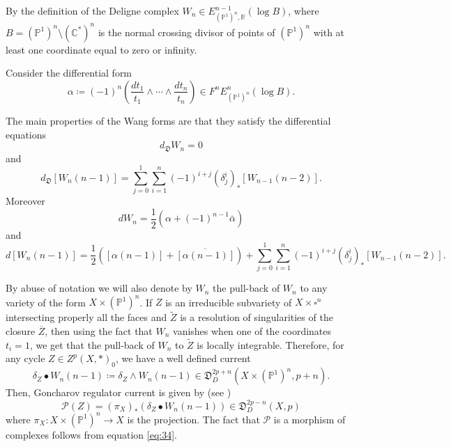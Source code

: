 \documentclass[11pt,a4paper]{amsart}
\newcommand{\C}{\mathds{C}}
\renewcommand{\P}{\mathds{P}}
\newcommand{\R}{\mathds{R}}
\newcommand{\caP}{\mathcal{P}}
\newcommand{\fD}{\mathfrak{D}}
\numberwithin{equation}{section}
\theoremstyle{plain}
\theoremstyle{definition}
\begin{document}
By the definition of the Deligne complex $W_{n}\in
E^{n-1}_{(\P^{1})^{n},\R}(\log B)$, where $B=(\P^{1})^{n}\setminus
(\C^{\ast})^{n}$ is the normal crossing divisor of points of
$(\P^{1})^{n}$ with at least one coordinate equal to zero or infinity.

Consider the differential form
\begin{displaymath} \alpha
\coloneqq(-1)^{n}\left(\frac{dt_{1}}{t_{1}}\wedge\cdots\wedge
\frac{dt_{n}}{t_{n}}\right)\in F^{n}E^{n}_{(\P^1)^{n}}(\log
B).
\end{displaymath}

The main properties of the Wang forms are that they satisfy the
differential equations
\begin{displaymath}
  d_{\fD}W_{n}=0
\end{displaymath}
and
\begin{equation}\label{eq:34}
  d_{\fD}[W_{n}(n-1)] =\sum_{j=0}^{1} \sum_{i=1}^{n}(-1)^{i+j}(\delta _{j}^{i})_{\ast}[W_{n-1}(n-2)]. 
\end{equation}
Moreover
\begin{displaymath}
  dW_n=\frac{1}{2}(\alpha +(-1)^{n-1}\bar \alpha )
\end{displaymath}
and 
\begin{equation}\label{eq:53}
  d[W_{n}(n-1)] =\frac{1}{2}([\alpha(n-1)] +\overline{[ \alpha(n-1)]} )+ \sum_{j=0}^{1} \sum_{i=1}^{n}(-1)^{i+j}(\delta _{j}^{i})_{\ast}[W_{n-1}(n-2)]. 
\end{equation}


 By abuse of notation we will also denote by $W_{n}$ the 
pull-back of $W_{n}$ to any variety of the form $X\times
(\P^{1})^{n}$.
If $Z$ is an irreducible subvariety of $X\times
\square^{n}$ intersecting properly all the faces and $\widetilde Z$
is a resolution of singularities of the closure $\overline Z$, then
using the fact that $W_{n}$ vanishes when one of the coordinates
$t_{i}=1$, we get that the pull-back of $W_{n}$ to $\widetilde Z$ is locally integrable.  
Therefore, for any cycle $Z\in Z^{p}(X,\ast)_{0}$, we have a well defined current
\begin{displaymath}
\delta _{Z}\bullet W_{n}(n-1)\coloneqq \delta_{Z}\wedge W_{n}(n-1)\in
\fD^{2p+n}_{D}(X\times (\P^{1})^{n}, p+n). 
\end{displaymath}
Then, Goncharov regulator current is given by (see \cite[\S 6.1]{Gon95})
\begin{equation}\label{eq:30}
  \caP(Z)=(\pi _{X})_{\ast}(\delta _{Z}\bullet  W_{n}(n-1))\in \fD_{D}^{2p-n}(X,p)
\end{equation}
where $\pi _{X}\colon X\times (\P^{1})^{n}\to X$ is the
projection. The fact that $\caP$ is a morphism of complexes follows
from equation \eqref{eq:34}.
\end{document}
